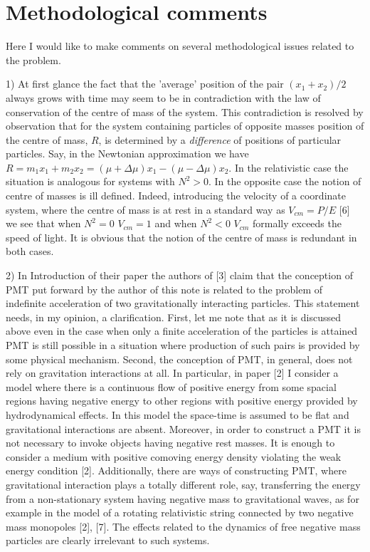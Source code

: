 \documentclass[aip,nofootinbib]{revtex4}
\begin{document}
\section{Methodological comments}

Here I would like to make comments on several methodological
issues related to the problem.

1) At first glance the fact that the 'average' position of the
pair $(x_1+x_2)/2$ always grows with time may seem to be in
contradiction with the law of conservation of the centre of mass
of the system. This contradiction is resolved by observation that
for the system containing particles of opposite masses position of
the centre of mass, $R$, is determined by a {\it difference } of
positions of particular particles. Say, in the Newtonian
approximation we have $R=m_1x_1+m_2x_2=(\mu+\Delta
\mu)x_1-(\mu-\Delta \mu)x_2$. In the relativistic case the
situation is analogous for systems with $N^2 > 0$. In the opposite
case the notion of centre of masses is ill defined. Indeed,
introducing the velocity of a coordinate system, where the centre
of mass is at rest in a standard way  as $V_{cm}=P/E$ [6] we see
that when $N^{2}=0$ $V_{cm}=1$ and when $N^{2} < 0 $ $V_{cm}$
formally exceeds the speed of light. It is obvious that the notion
of the centre of mass is redundant in both cases.


2) In Introduction of their paper the authors of [3] claim that
the conception of PMT put forward by the author of this note is
related to the problem of indefinite acceleration of two
gravitationally interacting particles. This statement needs, in my
opinion, a clarification. First, let me note that as it is
discussed above even in the case when only a finite acceleration
of the particles is attained  PMT is still possible in a situation
where production of such pairs is provided by some physical
mechanism. Second, the conception of PMT, in general, does not
rely on gravitation interactions at all. In particular, in paper
[2] I consider a model where there is a continuous flow of
positive energy from some spacial regions having negative energy
to other regions with positive energy provided by hydrodynamical
effects. In this model the space-time is assumed to be flat and
gravitational interactions are absent. Moreover, in order to
construct a PMT it is not necessary to invoke objects having
negative rest masses. It is enough to consider a medium with
positive comoving energy density violating the weak energy
condition [2]. Additionally, there are ways of constructing PMT,
where gravitational interaction plays a totally different role,
say, transferring the energy from a non-stationary system having
negative mass to gravitational waves, as for example in the model
of a rotating relativistic string connected by two negative mass
monopoles [2], [7]. The effects related to the dynamics of free
negative mass particles are clearly irrelevant to such systems.
\end{document}

